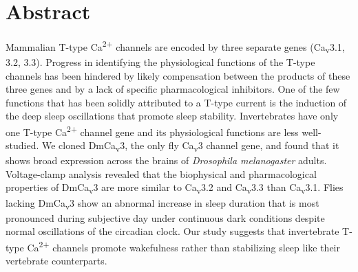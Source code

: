 \section*{Abstract}

Mammalian T-type Ca\textsuperscript{2+} channels are encoded by three separate genes (Ca\textsubscript{v}3.1, 3.2, 3.3).
Progress in identifying the physiological functions of the T-type channels has been hindered by likely compensation between the products of these three genes and by a lack of specific pharmacological inhibitors.
One of the few functions that has been solidly attributed to a T-type current is the induction of the deep sleep oscillations that promote sleep stability.
Invertebrates have only one T-type Ca\textsuperscript{2+} channel gene and its physiological functions are less well-studied.
We cloned DmCa\textsubscript{v}3, the only fly Ca\textsubscript{v}3 channel gene, and found that it shows broad expression across the brains of \emph{Drosophila melanogaster} adults.
Voltage-clamp analysis revealed that the biophysical and pharmacological properties of DmCa\textsubscript{v}3 are more similar to Ca\textsubscript{v}3.2 and Ca\textsubscript{v}3.3 than Ca\textsubscript{v}3.1.
Flies lacking DmCa\textsubscript{v}3 show an abnormal increase in sleep duration that is most pronounced during subjective day under continuous dark conditions despite normal oscillations of the circadian clock.
Our study suggests that invertebrate T-type Ca\textsuperscript{2+} channels promote wakefulness rather than stabilizing sleep like their vertebrate counterparts.
  
